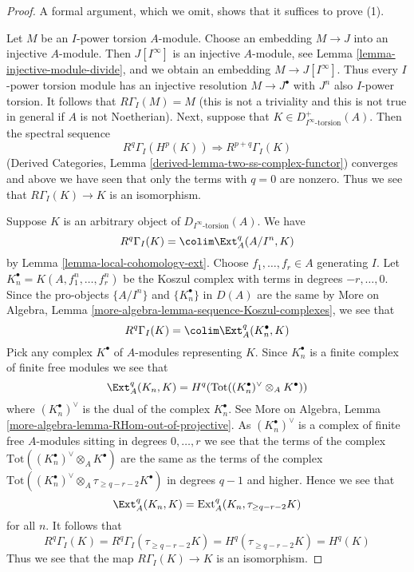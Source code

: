\begin{proof}
A formal argument, which we omit, shows that it suffices to prove (1).

\medskip\noindent
Let $M$ be an $I$-power torsion $A$-module. Choose an embedding
$M \to J$ into an injective $A$-module. Then $J[I^\infty]$ is
an injective $A$-module, see Lemma \ref{lemma-injective-module-divide},
and we obtain an embedding $M \to J[I^\infty]$.
Thus every $I$-power torsion module has an injective resolution
$M \to J^\bullet$ with $J^n$ also $I$-power torsion. It follows
that $R\Gamma_I(M) = M$ (this is not a triviality and this is not
true in general if $A$ is not Noetherian). Next, suppose that
$K \in D_{I^\infty\text{-torsion}}^+(A)$. Then the spectral sequence
$$
R^q\Gamma_I(H^p(K)) \Rightarrow R^{p + q}\Gamma_I(K)
$$
(Derived Categories, Lemma \ref{derived-lemma-two-ss-complex-functor})
converges and above we have seen that only the terms with $q = 0$
are nonzero. Thus we see that $R\Gamma_I(K) \to K$ is an isomorphism.

\medskip\noindent
Suppose $K$ is an arbitrary object of $D_{I^\infty\text{-torsion}}(A)$.
We have
$$
R^q\Gamma_I(K) = \colim \Ext^q_A(A/I^n, K)
$$
by Lemma \ref{lemma-local-cohomology-ext}. Choose $f_1, \ldots, f_r \in A$
generating $I$. Let $K_n^\bullet = K(A, f_1^n, \ldots, f_r^n)$ be the
Koszul complex with terms in degrees $-r, \ldots, 0$. Since the
pro-objects $\{A/I^n\}$ and $\{K_n^\bullet\}$ in $D(A)$ are the same by
More on Algebra, Lemma \ref{more-algebra-lemma-sequence-Koszul-complexes},
we see that
$$
R^q\Gamma_I(K) = \colim \Ext^q_A(K_n^\bullet, K)
$$
Pick any complex $K^\bullet$ of $A$-modules representing $K$.
Since $K_n^\bullet$ is a finite complex of finite free modules we see
that
$$
\Ext^q_A(K_n, K) =
H^q(\text{Tot}((K_n^\bullet)^\vee \otimes_A K^\bullet))
$$
where $(K_n^\bullet)^\vee$ is the dual of the complex $K_n^\bullet$.
See More on Algebra, Lemma \ref{more-algebra-lemma-RHom-out-of-projective}.
As $(K_n^\bullet)^\vee$ is a complex of finite free $A$-modules sitting
in degrees $0, \ldots, r$ we see that the terms of the complex
$\text{Tot}((K_n^\bullet)^\vee \otimes_A K^\bullet)$ are the
same as the terms of the complex
$\text{Tot}((K_n^\bullet)^\vee \otimes_A \tau_{\geq q - r - 2} K^\bullet)$
in degrees $q - 1$ and higher. Hence we see that
$$
\Ext^q_A(K_n, K) = \text{Ext}^q_A(K_n, \tau_{\geq q - r - 2}K)
$$
for all $n$. It follows that
$$
R^q\Gamma_I(K) = R^q\Gamma_I(\tau_{\geq q - r - 2}K) =
H^q(\tau_{\geq q - r - 2}K) = H^q(K)
$$
Thus we see that the map $R\Gamma_I(K) \to K$ is an isomorphism.
\end{proof}

